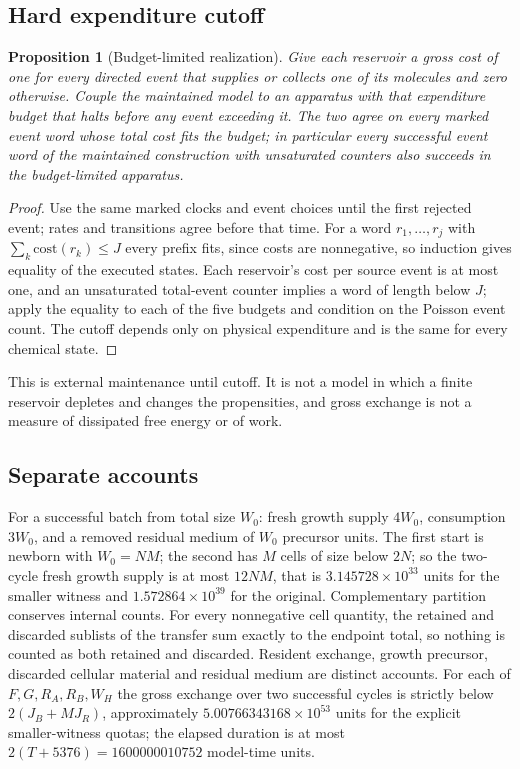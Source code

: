 \documentclass[11pt,a4paper]{article}
\theoremstyle{plain}
\newtheorem{proposition}[theorem]{Proposition}
\theoremstyle{definition}
\theoremstyle{remark}
\newcommand{\Hs}{H}
\begin{document}
\subsection{Hard expenditure cutoff}
\begin{proposition}[Budget-limited realization]\label{prop:budget}
Give each reservoir a gross cost of one for every directed event that supplies or collects one of its molecules and zero otherwise. Couple the maintained model to an apparatus with that expenditure budget that halts before any event exceeding it. The two agree on every marked event word whose total cost fits the budget; in particular every successful event word of the maintained construction with unsaturated counters also succeeds in the budget-limited apparatus.
\end{proposition}

\begin{proof}
Use the same marked clocks and event choices until the first rejected event; rates and transitions agree before that time. For a word $r_1,\dots,r_j$ with $\sum_k\mathrm{cost}(r_k)\le J$ every prefix fits, since costs are nonnegative, so induction gives equality of the executed states. Each reservoir's cost per source event is at most one, and an unsaturated total-event counter implies a word of length below $J$; apply the equality to each of the five budgets and condition on the Poisson event count. The cutoff depends only on physical expenditure and is the same for every chemical state.
\end{proof}

This is external maintenance until cutoff. It is not a model in which a finite reservoir depletes and changes the propensities, and gross exchange is not a measure of dissipated free energy or of work.

\subsection{Separate accounts}
For a successful batch from total size $W_0$: fresh growth supply $4W_0$, consumption $3W_0$, and a removed residual medium of $W_0$ precursor units. The first start is newborn with $W_0=NM$; the second has $M$ cells of size below $2N$; so the two-cycle fresh growth supply is at most $12NM$, that is $3.145728\times10^{33}$ units for the smaller witness and $1.572864\times10^{39}$ for the original. Complementary partition conserves internal counts. For every nonnegative cell quantity, the retained and discarded sublists of the transfer sum exactly to the endpoint total, so nothing is counted as both retained and discarded. Resident exchange, growth precursor, discarded cellular material and residual medium are distinct accounts. For each of $F,G,R_A,R_B,W_\Hs$ the gross exchange over two successful cycles is strictly below $2(J_B+MJ_R)$, approximately $5.00766343168\times10^{53}$ units for the explicit smaller-witness quotas; the elapsed duration is at most $2(T+5376)=1600000010752$ model-time units.
\end{document}
